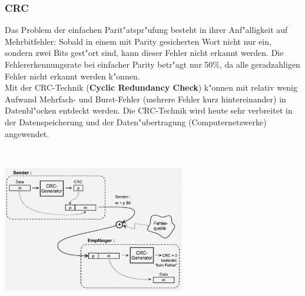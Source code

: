 \subsubsection{CRC}
	\begin{minipage}{9cm}
		Das Problem der einfachen Parit"atspr"ufung besteht in ihrer Anf"alligkeit auf Mehrbitfehler: Sobald in einem mit Parity gesicherten Wort nicht nur ein, sondern zwei Bits gest"ort sind, kann dieser Fehler nicht erkannt werden. Die Fehlererkennungsrate bei einfacher Parity betr"agt nur 50\%, da alle geradzahligen Fehler nicht erkannt werden k"onnen.\\

		Mit der CRC-Technik (\textbf{Cyclic Redundancy Check}) k"onnen mit relativ wenig Aufwand Mehrfach- und Burst-Fehler (mehrere Fehler kurz hintereinander) in Datenbl"ocken entdeckt werden. Die CRC-Technik wird heute sehr verbreitet in der Datenspeicherung
			und der Daten"ubertragung (Computernetzwerke) angewendet.\\
	\end{minipage}
	\begin{minipage}{0.5cm}
		\ \
	\end{minipage}
	\begin{minipage}{9cm}
		\includegraphics[width=8cm]{pics/2-CRC-Generator}
	\end{minipage}
	
	
\newpage
